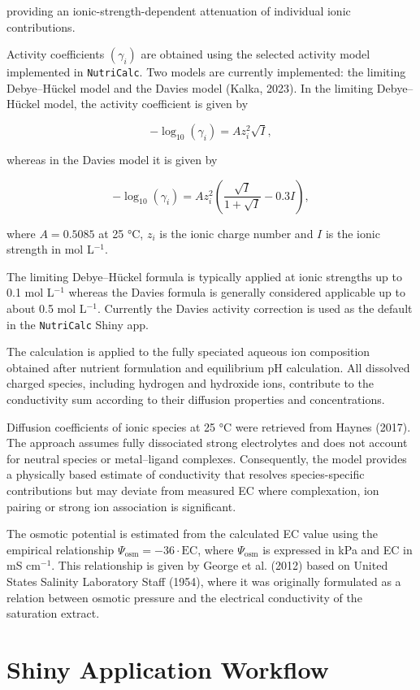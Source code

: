 \documentclass[
  letterpaper,
  DIV=11,
  numbers=noendperiod]{scrreprt}
\begin{document}
providing an ionic-strength-dependent attenuation of individual ionic
contributions.

Activity coefficients \((\gamma_i)\) are obtained using the selected
activity model implemented in \texttt{NutriCalc}. Two models are
currently implemented: the limiting Debye--Hückel model and the Davies
model (Kalka, 2023). In the limiting Debye--Hückel model, the activity
coefficient is given by

\[
-\log_{10}(\gamma_i)
=
A z_i^2 \sqrt{I},
\]

whereas in the Davies model it is given by

\[
-\log_{10}(\gamma_i)
=
A z_i^2 \left(\frac{\sqrt{I}}{1+\sqrt{I}} - 0.3I\right),
\]

where \(A = 0.5085\) at 25 °C, \(z_i\) is the ionic charge number and
\(I\) is the ionic strength in mol L\(^{-1}\).

The limiting Debye--Hückel formula is typically applied at ionic
strengths up to 0.1 mol L\(^{-1}\) whereas the Davies formula is
generally considered applicable up to about 0.5 mol L\(^{-1}\).
Currently the Davies activity correction is used as the default in the
\texttt{NutriCalc} Shiny app.

The calculation is applied to the fully speciated aqueous ion
composition obtained after nutrient formulation and equilibrium pH
calculation. All dissolved charged species, including hydrogen and
hydroxide ions, contribute to the conductivity sum according to their
diffusion properties and concentrations.

Diffusion coefficients of ionic species at 25 °C were retrieved from
Haynes (2017). The approach assumes fully dissociated strong
electrolytes and does not account for neutral species or metal--ligand
complexes. Consequently, the model provides a physically based estimate
of conductivity that resolves species-specific contributions but may
deviate from measured EC where complexation, ion pairing or strong ion
association is significant.

The osmotic potential is estimated from the calculated EC value using
the empirical relationship
\(\Psi_{\mathrm{osm}} = -36 \cdot \mathrm{EC}\), where
\(\Psi_{\mathrm{osm}}\) is expressed in kPa and EC in mS cm\(^{-1}\).
This relationship is given by George et al. (2012) based on United
States Salinity Laboratory Staff (1954), where it was originally
formulated as a relation between osmotic pressure and the electrical
conductivity of the saturation extract.

\section{Shiny Application Workflow}\label{shiny-application-workflow}
\end{document}
